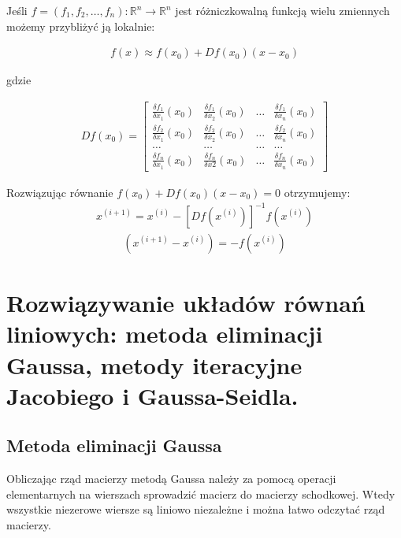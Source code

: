 \documentclass[12pt]{article}
\begin{document}
    Jeśli $f = (f_1, f_2, \dots, f_n): \mathbb{R}^n \rightarrow \mathbb{R}^n$ jest różniczkowalną funkcją wielu zmiennych
    możemy przybliżyć ją lokalnie:

    \begin{align*}
        f(x) \approx f(x_0) + Df(x_0)(x - x_0)
    \end{align*}

    gdzie

    \begin{align*}
        Df(x_0) =
        \begin{bmatrix}
            \frac{\delta f_1}{\delta x_1}(x_0) & \frac{\delta f_1}{\delta x_2}(x_0) & \dots & \frac{\delta f_1}{\delta x_n}(x_0)\\
            \frac{\delta f_2}{\delta x_1}(x_0) & \frac{\delta f_2}{\delta x_2}(x_0) & \dots & \frac{\delta f_2}{\delta x_n}(x_0)\\
            \dots & \dots & \dots & \dots\\
            \frac{\delta f_n}{\delta x_1}(x_0) & \frac{\delta f_n}{\delta x2}(x_0) & \dots & \frac{\delta f_n}{\delta x_n}(x_0)
        \end{bmatrix}
    \end{align*}

    Rozwiązując równanie $f(x_0) + Df(x_0)(x - x_0) = 0$ otrzymujemy:
    \begin{align*}
        x^{(i+1)} = x^{(i)} - [Df(x^{(i)})]^{-1} f(x^{(i)})
    \end{align*}
    \begin{align*}
    [Df(x^{(i)})]
        ( x^{(i+1)} - x^{(i)} ) = -f(x^{(i)})
    \end{align*}

    \newpage

    \section{Rozwiązywanie układów równań liniowych: metoda eliminacji Gaussa, metody iteracyjne Jacobiego i Gaussa-Seidla.}

    \subsection{Metoda eliminacji Gaussa}

    Obliczając rząd macierzy metodą Gaussa należy za pomocą operacji elementarnych na wierszach sprowadzić macierz do
    macierzy schodkowej. Wtedy wszystkie niezerowe wiersze są liniowo niezależne i można łatwo odczytać rząd macierzy.
\end{document}
